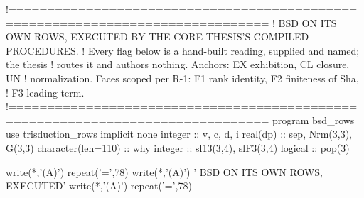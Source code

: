 \documentclass[10pt,twocolumn]{article}
\newenvironment{Shaded}{}{}
\newcommand{\CommentTok}[1]{#1}
\newcommand{\DataTypeTok}[1]{#1}
\newcommand{\DecValTok}[1]{#1}
\newcommand{\FunctionTok}[1]{#1}
\newcommand{\KeywordTok}[1]{#1}
\newcommand{\NormalTok}[1]{#1}
\newcommand{\StringTok}[1]{#1}
\providecommand{\CommentTok}[1]{#1}
\providecommand{\DataTypeTok}[1]{#1}
\providecommand{\DecValTok}[1]{#1}
\providecommand{\FunctionTok}[1]{#1}
\providecommand{\KeywordTok}[1]{#1}
\providecommand{\NormalTok}[1]{#1}
\providecommand{\StringTok}[1]{#1}
\providecommand{\textquotesingle}{'}
\providecommand{\CommentTok}[1]{#1}
\providecommand{\DataTypeTok}[1]{#1}
\providecommand{\DecValTok}[1]{#1}
\providecommand{\FunctionTok}[1]{#1}
\providecommand{\KeywordTok}[1]{#1}
\providecommand{\NormalTok}[1]{#1}
\providecommand{\StringTok}[1]{#1}
\begin{document}
\begin{strip}
\begin{Shaded}
\begin{Highlighting}[]
\CommentTok{!===============================================================================}
\CommentTok{!  BSD ON ITS OWN ROWS, EXECUTED BY THE CORE THESIS\textquotesingle{}S COMPILED PROCEDURES.}
\CommentTok{!  Every flag below is a hand{-}built reading, supplied and named; the thesis}
\CommentTok{!  routes it and authors nothing. Anchors: EX exhibition, CL closure, UN}
\CommentTok{!  normalization. Faces scoped per R{-}1: F1 rank identity, F2 finiteness of Sha,}
\CommentTok{!  F3 leading term.}
\CommentTok{!===============================================================================}
\KeywordTok{program}\NormalTok{ bsd\_rows}
  \KeywordTok{use}\NormalTok{ trisduction\_rows}
  \KeywordTok{implicit} \KeywordTok{none}
  \DataTypeTok{integer}  \DataTypeTok{::}\NormalTok{ v, c, d, i}
  \DataTypeTok{real(dp)} \DataTypeTok{::}\NormalTok{ sep, Nrm(}\DecValTok{3}\NormalTok{,}\DecValTok{3}\NormalTok{), G(}\DecValTok{3}\NormalTok{,}\DecValTok{3}\NormalTok{)}
  \DataTypeTok{character(len=110)} \DataTypeTok{::}\NormalTok{ why}
  \DataTypeTok{integer}  \DataTypeTok{::}\NormalTok{ sl13(}\DecValTok{3}\NormalTok{,}\DecValTok{4}\NormalTok{), slF3(}\DecValTok{3}\NormalTok{,}\DecValTok{4}\NormalTok{)}
  \DataTypeTok{logical}  \DataTypeTok{::}\NormalTok{ pop(}\DecValTok{3}\NormalTok{)}

  \FunctionTok{write(*}\NormalTok{,}\StringTok{\textquotesingle{}(A)\textquotesingle{}}\FunctionTok{)} \FunctionTok{repeat}\NormalTok{(}\StringTok{\textquotesingle{}=\textquotesingle{}}\NormalTok{,}\DecValTok{78}\NormalTok{)}
  \FunctionTok{write(*}\NormalTok{,}\StringTok{\textquotesingle{}(A)\textquotesingle{}}\FunctionTok{)} \StringTok{\textquotesingle{} BSD ON ITS OWN ROWS, EXECUTED\textquotesingle{}}
  \FunctionTok{write(*}\NormalTok{,}\StringTok{\textquotesingle{}(A)\textquotesingle{}}\FunctionTok{)} \FunctionTok{repeat}\NormalTok{(}\StringTok{\textquotesingle{}=\textquotesingle{}}\NormalTok{,}\DecValTok{78}\NormalTok{)}


\end{Highlighting}
\end{Shaded}
\end{strip}
\end{document}
